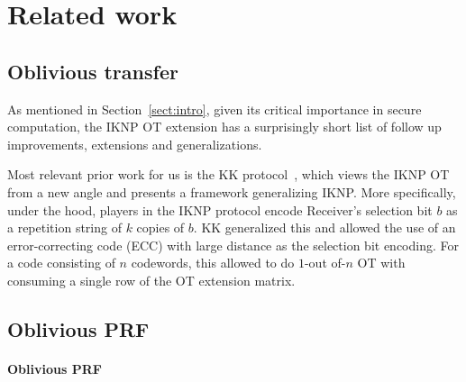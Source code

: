 \section{Related work}
\label{sect:relwork}

\subsection{Oblivious transfer}

As mentioned in Section~\ref{sect:intro}, given its critical importance in secure computation, the IKNP OT extension has a surprisingly short list of follow up improvements, extensions and generalizations. 

Most relevant prior work for us is the KK protocol~\cite{C:KolKum13}, which views the  IKNP OT from a new angle and presents a framework generalizing IKNP.  More specifically, under the hood, players in the IKNP protocol encode Receiver's selection bit $b$ as a repetition string of $k$ copies of $b$.  KK generalized this and allowed the use of an error-correcting code (ECC) with large distance as the selection bit encoding.  For a code consisting of $n$ codewords, this allowed to do $1$-out of-$n$ OT with consuming a single row of the OT extension matrix.


\subsection{Oblivious PRF}
\paragraph{Oblivious PRF} 


